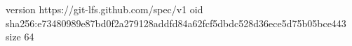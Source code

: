 version https://git-lfs.github.com/spec/v1
oid sha256:e73480989e87bd0f2a279128addfd84a62fcf5dbdc528d36ece5d75b05bce443
size 64

